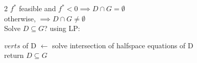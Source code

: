 \documentclass[8pt]{extarticle}
\begin{document}
\begin{multicols*}{2}
  $f^*$ feasible and $f^* < 0 \implies D \cap G = \emptyset$\\
  otherwise, $\implies D \cap G \not= \emptyset$\\

  Solve $D \subseteq G $? using LP:\\
  \begin{algorithm}[H]
    $verts$ of D $\leftarrow$ solve intersection of halfspace equations of D\\
    return $D \subseteq G$
    \caption{Polyhedron Inclusion via Vertex Feasibility\label{algo:PolyhedronInclusion}}
  \end{algorithm}  

\end{multicols*}
\end{document}
